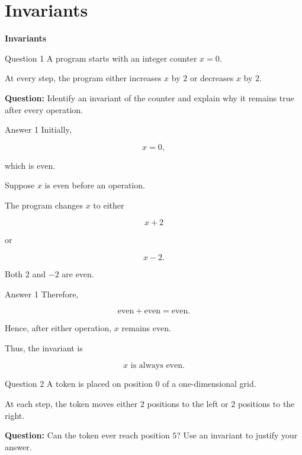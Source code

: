 \section{Invariants}

\begin{frame}
\centering
\Huge\textbf{Invariants}
\end{frame}


\begin{frame}{Question 1}
A program starts with an integer counter $x=0$.

At every step, the program either increases $x$ by $2$ or decreases $x$ by $2$.

\textbf{Question:} Identify an invariant of the counter and explain why it remains true after every operation.
\end{frame}

\begin{frame}{Answer 1}
Initially,

$$
x=0,
$$

which is even.

Suppose $x$ is even before an operation.

The program changes $x$ to either

$$
x+2
$$

or

$$
x-2.
$$

Both $2$ and $-2$ are even.
\end{frame}

\begin{frame}{Answer 1}
Therefore,

$$
\text{even}+\text{even}=\text{even}.
$$

Hence, after either operation, $x$ remains even.

Thus, the invariant is

$$
\boxed{x\text{ is always even}.}
$$

\end{frame}


\begin{frame}{Question 2}
A token is placed on position $0$ of a one-dimensional grid.

At each step, the token moves either $2$ positions to the left or $2$ positions to the right.

\textbf{Question:} Can the token ever reach position $5$? Use an invariant to justify your answer.
\end{frame}

